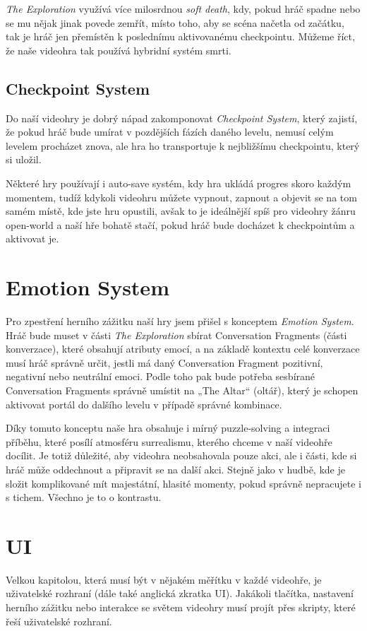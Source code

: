 \emph{The Exploration} využívá více milosrdnou \emph{soft death}, kdy, pokud hráč spadne nebo se mu nějak jinak povede zemřít, místo toho, aby se scéna načetla od začátku, tak je hráč jen přemístěn k poslednímu aktivovanému checkpointu. Můžeme říct, že naše videohra tak používá hybridní systém smrti.

\subsection{Checkpoint System}
Do naší videohry je dobrý nápad zakomponovat \emph{Checkpoint System}, který zajistí, že pokud hráč bude umírat v pozdějších fázích daného levelu, nemusí celým levelem procházet znova, ale hra ho transportuje k nejbližšímu checkpointu, který si uložil.

Některé hry používají i auto-save systém, kdy hra ukládá progres skoro každým momentem, tudíž kdykoli videohru můžete vypnout, zapnout a objevit se na tom samém místě, kde jste hru opustili, avšak to je ideálnější spíš pro videohry žánru open-world a naší hře bohatě stačí, pokud hráč bude docházet k checkpointům a aktivovat je.

\section{Emotion System}
Pro zpestření herního zážitku naší hry jsem přišel s konceptem \emph{Emotion System}. Hráč bude muset v části \emph{The Exploration} sbírat Conversation Fragments (části konverzace), které obsahují atributy emocí, a na základě kontextu celé konverzace musí hráč správně určit, jestli má daný Conversation Fragment pozitivní, negativní nebo neutrální emoci. Podle toho pak bude potřeba sesbírané Conversation Fragments správně umístit na „The Altar“ (oltář), který je schopen aktivovat portál do dalšího levelu v případě správné kombinace.

Díky tomuto konceptu naše hra obsahuje i mírný puzzle-solving a integraci příběhu, které posílí atmosféru surrealismu, kterého chceme v naší videohře docílit. Je totiž důležité, aby videohra neobsahovala pouze akci, ale i části, kde si hráč může oddechnout a připravit se na další akci. Stejně jako v hudbě, kde je složit komplikované mít majestátní, hlasité momenty, pokud správně nepracujete i s tichem. Všechno je to o kontrastu.

\section{UI}
Velkou kapitolou, která musí být v nějakém měřítku v každé videohře, je uživatelské rozhraní (dále také anglická zkratka UI). Jakákoli tlačítka, nastavení herního zážitku nebo interakce se světem videohry musí projít přes skripty, které řeší uživatelské rozhraní.

